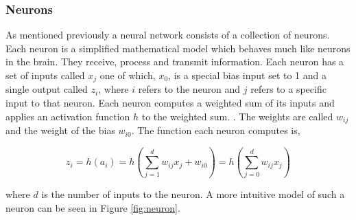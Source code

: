 \subsubsection{Neurons}\label{sec:neurons}

As mentioned previously a neural network consists of a collection of neurons.
Each neuron is a simplified mathematical model which behaves much like neurons
in the brain. They receive, process and transmit information. Each neuron has
a set of inputs called $x_{j}$ one of which, $x_{0}$, is a special bias input
set to 1 and a single output called $z_i$, where $i$ refers to the neuron and
$j$ refers to a specific input to that neuron. Each neuron computes a weighted
sum of its inputs and applies an activation function $h$ to the weighted sum.
\citep{Igel, Bishop}. The weights are called $w_{ij}$ and the weight of the bias
$w_{i0}$. The function each neuron computes is,

\begin{equation}\label{eq:neuron}
    z_i = h(a_i) = h\left(
        \sum_{j = 1}^d w_{ij}x_j + w_{i0}
 \right) = h\left(
        \sum_{j = 0}^d w_{ij}x_j \right)
\end{equation}

where $d$ is the number of inputs to the neuron. A more intuitive model of such
a neuron can be seen in Figure \ref{fig:neuron}.

